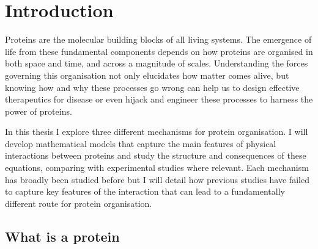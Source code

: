 

\chapter{\label{ch:1-intro}Introduction} 

\minitoc
\newpage

Proteins are the molecular building blocks of all living systems. The emergence of life from these fundamental components depends on how proteins are organised in both space and time, and across a magnitude of scales. Understanding the forces governing this organisation not only elucidates how matter comes alive, but knowing how and why these processes go wrong can help us to design effective therapeutics for disease or even hijack and engineer these processes to harness the power of proteins.

In this thesis I explore three different mechanisms for protein organisation. I will develop mathematical models that capture the main features of physical interactions between proteins and study the structure and consequences of these equations, comparing with experimental studies where relevant. Each mechanism has broadly been studied before but I will detail how previous studies have failed to capture key features of the interaction that can lead to a fundamentally different route for protein organisation.

\section{What is a protein}

